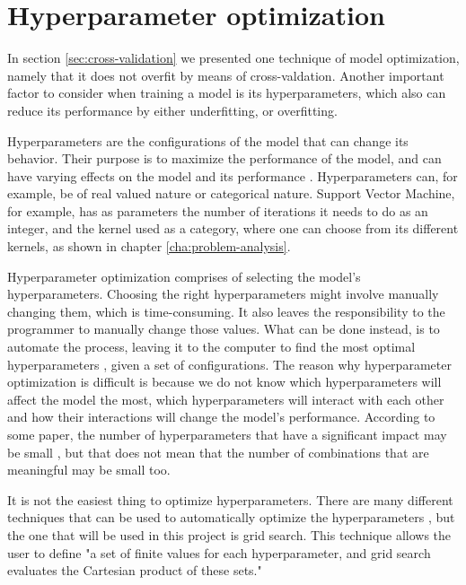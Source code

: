 \section{Hyperparameter optimization}\label{sec:hyperparam}

In section \ref{sec:cross-validation} we presented one technique of model optimization, namely that it does not overfit by means of cross-valdation. Another important factor to consider when training a model is its hyperparameters, which also can reduce its performance by either underfitting, or overfitting.


Hyperparameters are the configurations of the model that can change its behavior. Their purpose is to maximize the performance of the model, and can have varying effects on the model and its performance \cite{hyperparam-search}. Hyperparameters can, for example, be of real valued nature or categorical nature. Support Vector Machine, for example, has as parameters the number of iterations it needs to do as an integer, and the kernel used as a category, where one can choose from its different kernels, as shown in chapter \ref{cha:problem-analysis}.


Hyperparameter optimization comprises of selecting the model's hyperparameters. Choosing the right hyperparameters might involve manually changing them, which is time-consuming. It also leaves the responsibility to the programmer to manually change those values. What can be done instead, is to automate the process, leaving it to the computer to find the most optimal hyperparameters \cite{automated-machine-learning}, given a set of configurations. The reason why hyperparameter optimization is difficult is because we do not know which hyperparameters will affect the model the most, which hyperparameters will interact with each other and how their interactions will change the model's performance. According to some paper, the number of hyperparameters that have a significant impact may be small \cite{hyperparam-search}, but that does not mean that the number of combinations that are meaningful may be small too. 

It is not the easiest thing to optimize hyperparameters. There are many different techniques that can be used to automatically optimize the hyperparameters \cite{automated-machine-learning}, but the one that will be used in this project is grid search. This technique allows the user to define "a set of finite values for each hyperparameter, and grid search evaluates the Cartesian product of these sets."\cite{automated-machine-learning} 


